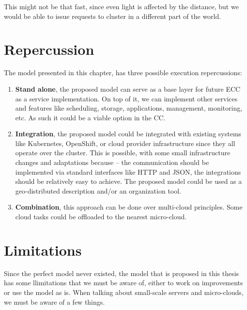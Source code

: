 This might not be that fast, since even light is affected by the distance, but we would be able to issue requests to cluster in a different part of the world.
%
%
\section{Repercussion}\label{sec:repercussion}
%
The model presented in this chapter, has three possible execution repercussions:

\begin{enumerate}[start=1,label={(\bfseries \arabic*)}]
	\item \textbf{Stand alone}, the proposed model can serve as a base layer for future ECC as a service implementation. On top of it, we can implement other services and features like scheduling, storage, applications, management, monitoring, etc. As such it could be a viable option in the CC.
	\item \textbf{Integration}, the proposed model could be integrated with existing systems like Kubernetes, OpenShift, or cloud provider infrastructure since they all operate over the cluster. This is possible, with some small infrastructure changes and adaptations because -- the communication should be implemented via standard interfaces like HTTP and JSON, the integrations should be relatively easy to achieve. The proposed model could be used as a geo-distributed description and/or an organization tool.
	\item \textbf{Combination}, this approach can be done over multi-cloud principles. Some cloud tasks could be offloaded to the nearest micro-cloud.
\end{enumerate} 
%
%
\section{Limitations}\label{sec:limitations}
%
Since the perfect model never existed, the model that is proposed in this thesis has some llimitations that we must be aware of, either to work on improvements or use the model as is. When talking about small-scale servers and micro-clouds, we must be aware of a few things.


